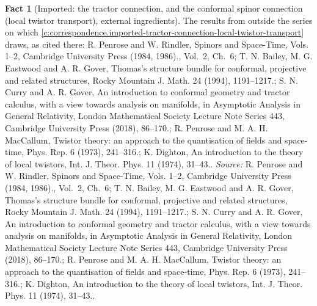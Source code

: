 \documentclass[11pt]{article}
\theoremstyle{definition}
\newtheorem{fact}[theorem]{Fact}
\theoremstyle{plain}
\begin{document}
\begin{fact}[Imported: the tractor connection, and the conformal spinor connection (local twistor transport), external ingredients]\label{c:correspondence.imported-tractor-connection-local-twistor-transport-external}
The results from outside the series on which \ref{c:correspondence.imported-tractor-connection-local-twistor-transport} draws, as cited there: R. Penrose and W. Rindler, Spinors and Space-Time, Vols. 1--2, Cambridge University Press (1984, 1986)., Vol.~2, Ch.~6; T. N. Bailey, M. G. Eastwood and A. R. Gover, Thomas's structure bundle for conformal, projective and related structures, Rocky Mountain J. Math. 24 (1994), 1191--1217.; S. N. Curry and A. R. Gover, An introduction to conformal geometry and tractor calculus, with a view towards analysis on manifolds, in Asymptotic Analysis in General Relativity, London Mathematical Society Lecture Note Series 443, Cambridge University Press (2018), 86--170.; R. Penrose and M. A. H. MacCallum, Twistor theory: an approach to the quantisation of fields and space-time, Phys. Rep. 6 (1973), 241--316.; K. Dighton, An introduction to the theory of local twistors, Int. J. Theor. Phys. 11 (1974), 31--43..
\emph{Source:} R. Penrose and W. Rindler, Spinors and Space-Time, Vols. 1--2, Cambridge University Press (1984, 1986)., Vol.~2, Ch.~6; T. N. Bailey, M. G. Eastwood and A. R. Gover, Thomas's structure bundle for conformal, projective and related structures, Rocky Mountain J. Math. 24 (1994), 1191--1217.; S. N. Curry and A. R. Gover, An introduction to conformal geometry and tractor calculus, with a view towards analysis on manifolds, in Asymptotic Analysis in General Relativity, London Mathematical Society Lecture Note Series 443, Cambridge University Press (2018), 86--170.; R. Penrose and M. A. H. MacCallum, Twistor theory: an approach to the quantisation of fields and space-time, Phys. Rep. 6 (1973), 241--316.; K. Dighton, An introduction to the theory of local twistors, Int. J. Theor. Phys. 11 (1974), 31--43..
\end{fact}
\end{document}
